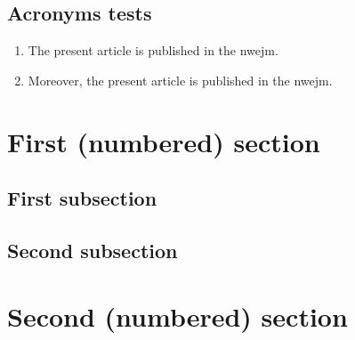 \documentclass[
]{nwejmart}
\begin{document}
\subsection{Acronyms tests}
%
\begin{enumerate}
\item The present article is published in the \gls{nwejm}.
\item Moreover, the present article is published in the \gls{nwejm}.
\end{enumerate}
%
\section{First (numbered) section}\label{sec:first-numbered}
\lipsum[2]
\subsection{First subsection}
\lipsum[3-8]
\subsection{Second subsection}
\lipsum[9-15]
\section{Second (numbered) section}
\lipsum[16-38]
%
\printbibliography
%
\end{document}
